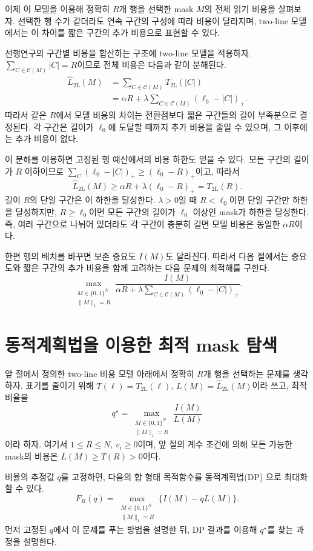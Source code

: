 이제 이 모델을 이용해 정확히 $R$개 행을 선택한 mask $M$의 전체 읽기 비용을 살펴보자. 선택한 행 수가 같더라도 연속 구간의 구성에 따라 비용이 달라지며, two-line 모델에서는 이 차이를 짧은 구간의 추가 비용으로 표현할 수 있다.

선행연구의 구간별 비용을 합산하는 구조에 two-line 모델을 적용하자. $\sum_{C\in\mathcal C(M)}|C|=R$이므로 전체 비용은 다음과 같이 분해된다.
\[
\begin{aligned}
\widehat L_{\mathrm{2L}}(M)
&=\sum_{C\in\mathcal C(M)}T_{\mathrm{2L}}(|C|)\\
&=\alpha R
+\lambda\sum_{C\in\mathcal C(M)}(\ell_0-|C|)_+.
\end{aligned}
\]
따라서 같은 $R$에서 모델 비용의 차이는 전환점보다 짧은 구간들의 길이 부족분으로 결정된다. 각 구간은 길이가 $\ell_0$에 도달할 때까지 추가 비용을 줄일 수 있으며, 그 이후에는 추가 비용이 없다.

이 분해를 이용하면 고정된 행 예산에서의 비용 하한도 얻을 수 있다. 모든 구간의 길이가 $R$ 이하이므로 $\sum_C(\ell_0-|C|)_+\ge(\ell_0-R)_+$이고, 따라서
\[
\widehat L_{\mathrm{2L}}(M)
\ge
\alpha R+\lambda(\ell_0-R)_+
=T_{\mathrm{2L}}(R).
\]
길이 $R$의 단일 구간은 이 하한을 달성한다. $\lambda>0$일 때 $R<\ell_0$이면 단일 구간만 하한을 달성하지만, $R\ge\ell_0$이면 모든 구간의 길이가 $\ell_0$ 이상인 mask가 하한을 달성한다. 즉, 여러 구간으로 나뉘어 있더라도 각 구간이 충분히 길면 모델 비용은 동일한 $\alpha R$이다.

한편 행의 배치를 바꾸면 보존 중요도 $I(M)$도 달라진다. 따라서 다음 절에서는 중요도와 짧은 구간의 추가 비용을 함께 고려하는 다음 문제의 최적해를 구한다.
\[
\max_{\substack{M\in\{0,1\}^N\\\|M\|_1=R}}
\frac{I(M)}
{\displaystyle
\alpha R+
\lambda\sum_{C\in\mathcal C(M)}(\ell_0-|C|)_+
}.
\]

\section{동적계획법을 이용한 최적 mask 탐색}\label{sec:dp}

앞 절에서 정의한 two-line 비용 모델 아래에서 정확히 $R$개 행을 선택하는 문제를 생각하자. 표기를 줄이기 위해 $T(\ell)=T_{\mathrm{2L}}(\ell)$, $L(M)=\widehat L_{\mathrm{2L}}(M)$이라 쓰고, 최적 비율을
\[
q^\star=
\max_{\substack{M\in\{0,1\}^N\\\|M\|_1=R}}
\frac{I(M)}{L(M)}
\]
이라 하자. 여기서 $1\le R\le N$, $v_i\ge0$이며, 앞 절의 계수 조건에 의해 모든 가능한 mask의 비용은 $L(M)\ge T(R)>0$이다.

비율의 추정값 $q$를 고정하면, 다음의 합 형태 목적함수를 동적계획법(DP) \cite{bellman1957}으로 최대화할 수 있다.
\[
F_R(q)=
\max_{\substack{M\in\{0,1\}^N\\\|M\|_1=R}}
\{I(M)-qL(M)\}.
\]
먼저 고정된 $q$에서 이 문제를 푸는 방법을 설명한 뒤, DP 결과를 이용해 $q^\star$를 찾는 과정을 설명한다.

